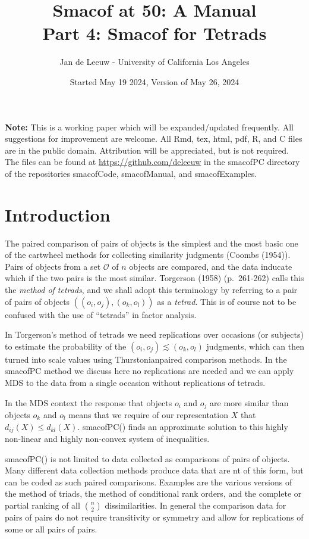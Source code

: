 \documentclass[
  12pt,
]{article}
\title{Smacof at 50: A Manual\\
Part 4: Smacof for Tetrads}
\author{Jan de Leeuw - University of California Los Angeles}
\date{Started May 19 2024, Version of May 26, 2024}
\newcommand{\sectionbreak}{\clearpage}
\begin{document}
\maketitle

{
\setcounter{tocdepth}{3}
\tableofcontents
}
\textbf{Note:} This is a working paper which will be expanded/updated
frequently. All suggestions for improvement are welcome. All Rmd, tex,
html, pdf, R, and C files are in the public domain. Attribution will be
appreciated, but is not required. The files can be found at
\url{https://github.com/deleeuw} in the smacofPC directory of the
repositories smacofCode, smacofManual, and smacofExamples.

\sectionbreak

\section{Introduction}\label{introduction}

The paired comparison of pairs of objects is the simplest and
the most basic one of the cartwheel methods for collecting
similarity judgments (Coombs (1954)).
Pairs of objects from a set
\(\mathcal{O}\) of \(n\) objects are compared, and the data inducate which if the two
pairs is the most similar. Torgerson (1958) (p.~261-262) calls this the \emph{method of tetrads}, and we shall adopt this terminology by referring to a pair of pairs of objects \(((o_i,o_j),(o_k,o_l))\) as a \emph{tetrad}. This is of course not to be confused
with the use of ``tetrads'' in factor analysis.

In Torgerson's method of tetrads we need replications over occasions (or subjects) to estimate the probability of the \((o_i,o_j)\lesssim (o_k,o_l)\) judgments, which can then turned into scale values using Thurstonianpaired comparison methods. In the smacofPC method we discuss here no replications are needed and we can apply MDS to the data from a single occasion without replications of tetrads.

In the MDS context the response
that objects \(o_i\) and \(o_j\) are more similar than objects
\(o_k\) and \(o_l\) means that we require
of our representation \(X\) that \(d_{ij}(X)\leq d_{kl}(X)\). smacofPC()
finds an approximate solution to this highly non-linear and
highly non-convex system of inequalities.

smacofPC() is not limited to data collected as comparisons of
pairs of objects. Many different data collection methods produce data that are nt of this form, but can be
coded as such paired comparisons. Examples are the various versions of the
method of triads, the method of conditional rank orders, and the
complete or partial ranking of all \(\binom{n}{2}\) dissimilarities.
In general the comparison data for pairs of pairs do not require transitivity
or symmetry and allow for replications of some or all pairs of
pairs.
\end{document}
